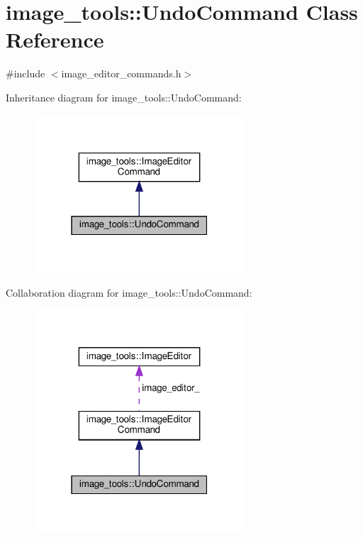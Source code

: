 \hypertarget{classimage__tools_1_1UndoCommand}{}\section{image\+\_\+tools\+:\+:Undo\+Command Class Reference}
\label{classimage__tools_1_1UndoCommand}


{\ttfamily \#include $<$image\+\_\+editor\+\_\+commands.\+h$>$}



Inheritance diagram for image\+\_\+tools\+:\+:Undo\+Command\+:
\nopagebreak
\begin{figure}[H]
\begin{center}
\leavevmode
\includegraphics[width=223pt]{classimage__tools_1_1UndoCommand__inherit__graph}
\end{center}
\end{figure}


Collaboration diagram for image\+\_\+tools\+:\+:Undo\+Command\+:
\nopagebreak
\begin{figure}[H]
\begin{center}
\leavevmode
\includegraphics[width=223pt]{classimage__tools_1_1UndoCommand__coll__graph}
\end{center}
\end{figure}
